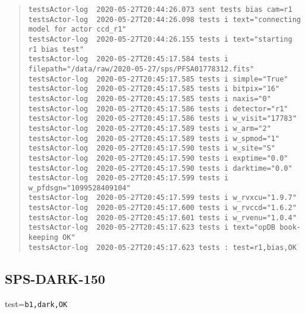 \begin{quote}
\begin{tiny}
\begin{verbatim}
testsActor-log  2020-05-27T20:44:26.073 sent tests bias cam=r1
testsActor-log  2020-05-27T20:44:26.098 tests i text="connecting model for actor ccd_r1"
testsActor-log  2020-05-27T20:44:26.155 tests i text="starting r1 bias test"
testsActor-log  2020-05-27T20:45:17.584 tests i filepath="/data/raw/2020-05-27/sps/PFSA01778312.fits"
testsActor-log  2020-05-27T20:45:17.585 tests i simple="True"
testsActor-log  2020-05-27T20:45:17.585 tests i bitpix="16"
testsActor-log  2020-05-27T20:45:17.585 tests i naxis="0"
testsActor-log  2020-05-27T20:45:17.586 tests i detector="r1"
testsActor-log  2020-05-27T20:45:17.586 tests i w_visit="17783"
testsActor-log  2020-05-27T20:45:17.589 tests i w_arm="2"
testsActor-log  2020-05-27T20:45:17.589 tests i w_spmod="1"
testsActor-log  2020-05-27T20:45:17.590 tests i w_site="S"
testsActor-log  2020-05-27T20:45:17.590 tests i exptime="0.0"
testsActor-log  2020-05-27T20:45:17.590 tests i darktime="0.0"
testsActor-log  2020-05-27T20:45:17.599 tests i w_pfdsgn="1099528409104"
testsActor-log  2020-05-27T20:45:17.599 tests i w_rvxcu="1.9.7"
testsActor-log  2020-05-27T20:45:17.600 tests i w_rvccd="1.6.2"
testsActor-log  2020-05-27T20:45:17.601 tests i w_rvenu="1.0.4"
testsActor-log  2020-05-27T20:45:17.623 tests i text="opDB book-keeping OK"
testsActor-log  2020-05-27T20:45:17.623 tests : test=r1,bias,OK
\end{verbatim}
\end{tiny}
\end{quote}

\subsection{SPS-DARK-150}
\label{sec:tc-150}

test=\texttt{b1,dark,OK}

